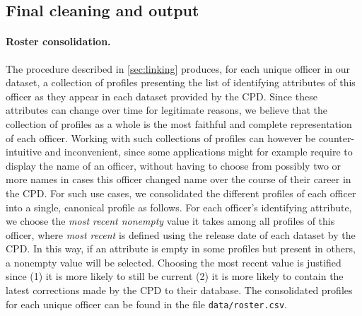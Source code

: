 

\subsection{Final cleaning and output}\label{sec:final-cleaning}

\paragraph{Roster consolidation.}
The procedure described in \cref{sec:linking} produces, for each unique officer
in our dataset, a collection of profiles presenting the list of identifying
attributes of this officer as they appear in each dataset provided by the CPD.
Since these attributes can change over time for legitimate reasons, we believe
that the collection of profiles as a whole is the most faithful and complete
representation of each officer. Working with such collections of profiles can
however be counter-intuitive and inconvenient, since some applications might
for example require to display the name of an officer, without having to choose
from possibly two or more names in cases this officer changed name over the
course of their career in the CPD. For such use cases, we consolidated the
different profiles of each officer into a single, canonical profile as follows.
For each officer's identifying attribute, we choose the \emph{most recent
nonempty} value it takes among all profiles of this officer, where \emph{most
recent} is defined using the release date of each dataset by the CPD. In this way,
if an attribute is empty in some profiles but present in others, a nonempty value
will be selected. Choosing the most recent value is justified since (1) it is
more likely to still be current (2) it is more likely to contain the latest
corrections made by the CPD to their database. The consolidated profiles
for each unique officer can be found in the file \texttt{data/roster.csv}.

